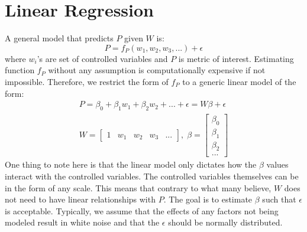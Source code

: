 \section{Linear Regression}
\label{LM}

A general model that predicts $P$ given $W$ is:
\begin{equation}
P=f_P(w_1, w_2, w_3, ...) +\epsilon
\end{equation}
where $w_i$'s are set of controlled variables and $P$ is metric of
interest. Estimating function $f_P$ without any assumption is
computationally expensive if not impossible. Therefore, we restrict
the form of $f_P$ to a generic linear model of the form:
\begin{equation}\label{lm}
\begin{split}
P=\beta_0+\beta_1 w_1+\beta_2 w_2+...+\epsilon=W\beta+\epsilon\\
W=\begin{bmatrix}1 & w_1 & w_2 & w_3 & ... \end{bmatrix},\;
\beta=\begin{bmatrix}\beta_0 \\ \beta_1 \\ \beta_2 \\ ... \end{bmatrix}
\end{split}
\end{equation}
One thing to note here is that the linear model only dictates how the
$\beta$ values interact with the controlled variables. The controlled
variables themselves can be in the form of any scale. This means that
contrary to what many believe, $W$ does not need to have linear
relationships with $P$. The goal is to estimate $\beta$ such
that $\epsilon$ is acceptable. Typically, we assume that the effects
of any factors not being modeled result in white noise and that the
$\epsilon$ should be normally distributed.
